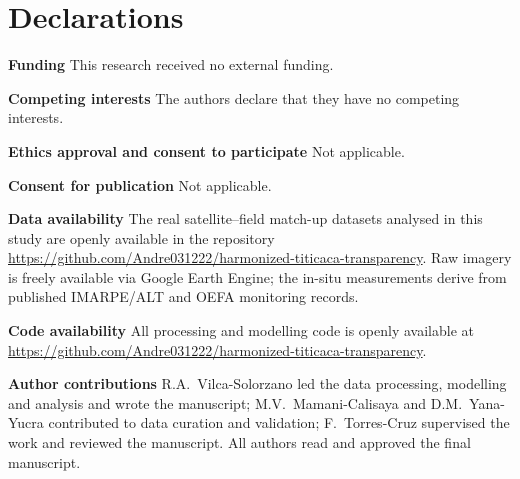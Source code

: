\documentclass[pdflatex,sn-basic]{sn-jnl}
\begin{document}
\section*{Declarations}

\noindent\textbf{Funding} This research received no external funding.

\noindent\textbf{Competing interests} The authors declare that they have no
competing interests.

\noindent\textbf{Ethics approval and consent to participate} Not applicable.

\noindent\textbf{Consent for publication} Not applicable.

\noindent\textbf{Data availability} The real satellite--field match-up datasets
analysed in this study are openly available in the repository
\url{https://github.com/Andre031222/harmonized-titicaca-transparency}. Raw imagery
is freely available via Google Earth Engine; the in-situ measurements derive from
published IMARPE/ALT and OEFA monitoring records.

\noindent\textbf{Code availability} All processing and modelling code is openly
available at \url{https://github.com/Andre031222/harmonized-titicaca-transparency}.

\noindent\textbf{Author contributions} R.A.~Vilca-Solorzano led the data
processing, modelling and analysis and wrote the manuscript; M.V.~Mamani-Calisaya
and D.M.~Yana-Yucra contributed to data curation and validation; F.~Torres-Cruz
supervised the work and reviewed the manuscript. All authors read and approved the
final manuscript.


\end{document}
